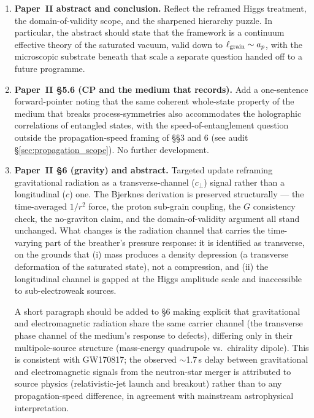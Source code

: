 \documentclass[11pt,a4paper]{article}
\begin{document}
\begin{enumerate}
      the cutoff argument.  Reframe the argument: divergent integrals
      of perturbative quantum gravity do not arise in SSV not because
      of a Planck-scale cutoff, but because the modes that would
      generate them are outside the framework's domain of validity ---
      the same kind of statement Navier--Stokes makes about
      sub-molecular eddies.  Drop the implicit Planck-scale framing.
\item \textbf{Paper~II abstract and conclusion.}  Reflect the reframed
      Higgs treatment, the domain-of-validity scope, and the sharpened
      hierarchy puzzle.  In particular, the abstract should state that
      the framework is a continuum effective theory of the saturated
      vacuum, valid down to $\ell_{\rm grain} \sim a_p$, with the
      microscopic substrate beneath that scale a separate question
      handed off to a future programme.

\item \textbf{Paper~II \S5.6 (CP and the medium that records).}  Add
      a one-sentence forward-pointer noting that the same coherent
      whole-state property of the medium that breaks process-symmetries
      also accommodates the holographic correlations of entangled
      states, with the speed-of-entanglement question outside the
      propagation-speed framing of \S\S3 and 6 (see audit
      \S\ref{sec:propagation_scope}).  No further development.

\item \textbf{Paper~II \S6 (gravity) and abstract.}  Targeted update
      reframing gravitational radiation as a transverse-channel
      ($c_\perp$) signal rather than a longitudinal ($c$) one.  The
      Bjerknes derivation is preserved structurally --- the
      time-averaged $1/r^2$ force, the proton sub-grain coupling, the
      $G$ consistency check, the no-graviton claim, and the
      domain-of-validity argument all stand unchanged.  What changes
      is the radiation channel that carries the time-varying part of
      the breather's pressure response: it is identified as
      transverse, on the grounds that (i) mass produces a density
      depression (a transverse deformation of the saturated state),
      not a compression, and (ii) the longitudinal channel is gapped
      at the Higgs amplitude scale and inaccessible to
      sub-electroweak sources.

      A short paragraph should be added to \S6 making explicit that
      gravitational and electromagnetic radiation share the same
      carrier channel (the transverse phase channel of the medium's
      response to defects), differing only in their multipole-source
      structure (mass-energy quadrupole vs.\ chirality dipole).  This
      is consistent with GW170817; the observed $\sim$1.7\,s delay
      between gravitational and electromagnetic signals from the
      neutron-star merger is attributed to source physics
      (relativistic-jet launch and breakout) rather than to any
      propagation-speed difference, in agreement with mainstream
      astrophysical interpretation.


\end{enumerate}
\end{document}
